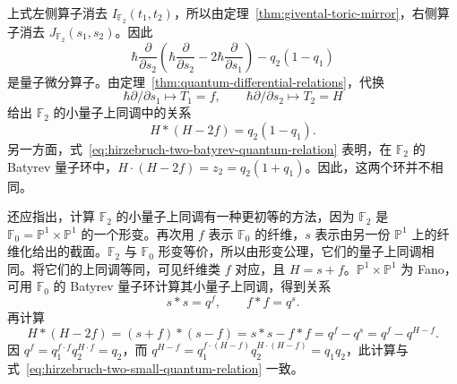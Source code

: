 \begin{example}
上式左侧算子消去 $I_{\mathbb F_2}(t_1,t_2)$，所以由定理~\ref{thm:givental-toric-mirror}，右侧算子消去 $J_{\mathbb F_2}(s_1,s_2)$。因此
\[
\hbar\frac\partial{\partial s_2}\left(\hbar\frac\partial{\partial s_2}-2\hbar\frac\partial{\partial s_1}\right)-q_2(1-q_1)
\]
是量子微分算子。由定理~\ref{thm:quantum-differential-relations}，代换
\[
\hbar\partial/\partial s_1\longmapsto T_1=f,\qquad\hbar\partial/\partial s_2\longmapsto T_2=H
\]
给出 $\mathbb F_2$ 的小量子上同调中的关系
\begin{equation}\label{eq:hirzebruch-two-small-quantum-relation}
H*(H-2f)=q_2(1-q_1).
\end{equation}
 另一方面，式~\eqref{eq:hirzebruch-two-batyrev-quantum-relation} 表明，在 $\mathbb F_2$ 的 Batyrev 量子环中，$H\mathbin{\cdot}(H-2f)=z_2=q_2(1+q_1)$。因此，这两个环并不相同。

 还应指出，计算 $\mathbb F_2$ 的小量子上同调有一种更初等的方法，因为 $\mathbb F_2$ 是 $\mathbb F_0=\mathbb P^1\times\mathbb P^1$ 的一个形变。再次用 $f$ 表示 $\mathbb F_0$ 的纤维，$s$ 表示由另一份 $\mathbb P^1$ 上的纤维化给出的截面。$\mathbb F_2$ 与 $\mathbb F_0$ 形变等价，所以由形变公理，它们的量子上同调相同。将它们的上同调等同，可见纤维类 $f$ 对应，且 $H=s+f$。$\mathbb P^1\times\mathbb P^1$ 为 Fano，可用 $\mathbb F_0$ 的 Batyrev 量子环计算其小量子上同调，得到关系
\[
s*s=q^f,\qquad f*f=q^s.
\]
再计算
\[
H*(H-2f)=(s+f)*(s-f)=s*s-f*f=q^f-q^s=q^f-q^{H-f}.
\]
因 $q^f=q_1^{f\cdot f}q_2^{H\cdot f}=q_2$，而 $q^{H-f}=q_1^{f\cdot(H-f)}q_2^{H\cdot(H-f)}=q_1q_2$，此计算与式~\eqref{eq:hirzebruch-two-small-quantum-relation} 一致。

\endgroup
\end{example}
